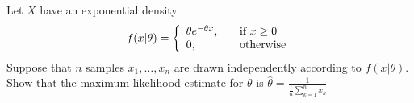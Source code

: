 \noindent
Let $X$ have an exponential density
\begin{equation}
f(x|\theta) = 
\left\{
\begin{array}{l l}
    \theta e^{-\theta x},  & \quad \text{if } x \geq 0 \\
    0, & \quad \text{otherwise}\\
\end{array}
\right.
\end{equation}
\noindent
Suppose that $n$ samples $x_1,\dots,x_n$ are drawn independently according to $f(x|\theta)$. Show that the maximum-likelihood estimate for $\theta$ is $\hat{\theta} = \frac{1}{\frac{1}{n}\sum_{k=1}^n x_k}$

